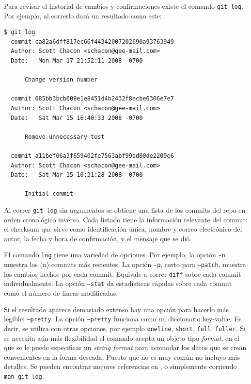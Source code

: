 \documentclass[spanish, 12pt, a4paper]{article}
\begin{document}
Para revisar el historial de cambios y confirmaciones existe el comando
\passthrough{\lstinline!git log!}. Por ejemplo, al correrlo dará un
resultado como este:

\begin{lstlisting}
$ git log
  commit ca82a6dff817ec66f44342007202690a93763949
  Author: Scott Chacon <schacon@gee-mail.com>
  Date:   Mon Mar 17 21:52:11 2008 -0700

      Change version number

  commit 085bb3bcb608e1e8451d4b2432f8ecbe6306e7e7
  Author: Scott Chacon <schacon@gee-mail.com>
  Date:   Sat Mar 15 16:40:33 2008 -0700

      Remove unnecessary test

  commit a11bef06a3f659402fe7563abf99ad00de2209e6
  Author: Scott Chacon <schacon@gee-mail.com>
  Date:   Sat Mar 15 10:31:28 2008 -0700

      Initial commit
\end{lstlisting}

Al correr \passthrough{\lstinline!git log!} sin argumentos se obtiene
una lista de los commits del repo en orden cronológico inverso. Cada
listado tiene la información relevante del commit: el checksum que sirve
como identificación única, nombre y correo electrónico del autor, la
fecha y hora de confirmación, y el mensaje que se dió.

El comando \passthrough{\lstinline!log!} tiene una variedad de opciones.
Por ejemplo, la opción \passthrough{\lstinline!-n!} muestra los (n)
commits más recientes. La opción \passthrough{\lstinline!-p!}, corto
para \passthrough{\lstinline!–patch!}, muestra los cambios hechos por
cada commit. Equivale a correr \passthrough{\lstinline!diff!} sobre cada
commit individualmente. La opción \passthrough{\lstinline!–stat!} da
estadísticas rápidas sobre cada commit como el número de líneas
modificadas.

Si el resultado aparece demasiado extenso hay una opción para hacerlo
más legible: \passthrough{\lstinline!–pretty!}. La opción
\passthrough{\lstinline!–pretty!} funciona como un diccionario
key-value. Es decir, se utiliza con otras opciones, por ejemplo
\passthrough{\lstinline!oneline!}, \passthrough{\lstinline!short!},
\passthrough{\lstinline!full!}, \passthrough{\lstinline!fuller!}. Si se
necesita aún más flexibilidad el comando acepta un objeto tipo
\emph{format}, en el que se le puede especificar un \emph{string format}
para acomodar los datos que se crean convenientes en la forma deseada.
Puesto que no es muy común no incluyo más detalles. Se pueden encontrar
mejores referencias en , o simplemente corriendo
\passthrough{\lstinline!man git log!}.
\end{document}
